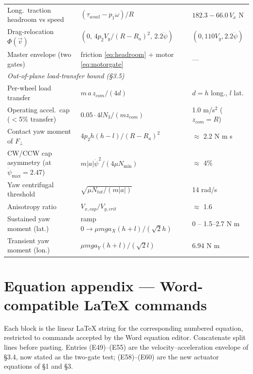 \documentclass[11pt]{article}
\begin{document}
\begin{table}[h]
\begin{tabular}{lll}
Long.\ traction headroom vs speed & $(\tau_{avail}-p_1\omega)/R$ & $182.3-66.0\,V_x$ N\\
Drag-relocation $\Phi(\vec v)$ & $(0,\,4p_2V_y/(R\!-\!R_a)^2,\,2.2\dot\psi)$ & $(0,110V_y,2.2\dot\psi)$\\
Master envelope (two gates) & friction \eqref{eq:headroom} + motor \eqref{eq:motorgate} & ---\\
\midrule
\multicolumn{3}{l}{\emph{Out-of-plane load-transfer bound (\S3.5)}}\\
Per-wheel load transfer & $m\,a\,z_{com}/(4d)$ & $d=h$ long., $l$ lat.\\
Operating accel.\ cap ($<$5\% transfer) & $0.05\cdot4lN_3/(m z_{com})$ & 1.0 m/s$^2$ ($z_{com}\!=\!R$)\\
\midrule
Contact yaw moment of $F_\perp$ & $4p_2h(h-l)/(R-R_a)^2$ & $\approx$ 2.2 N m s\\
CW/CCW cap asymmetry (at $\dot\psi_{\max}=2.47$) & $m|a|\dot\psi^2/(4\mu N_{\min})$ & $\approx$ 4\%\\
Yaw centrifugal threshold & $\sqrt{\mu N_{tot}/(m|a|)}$ & 14 rad/s\\
Anisotropy ratio & $V_{x,cap}/V_{y,crit}$ & $\approx$ 1.6\\
Sustained yaw moment (lat.) & ramp $0\to\mu mg a_X(h+l)/(\sqrt2 h)$ & 0 -- 1.5--2.7 N m\\
Transient yaw moment (lon.) & $\mu mg a_Y(h+l)/(\sqrt2 l)$ & 6.94 N m\\
\bottomrule
\end{tabular}
\end{table}

\appendix
\section{Equation appendix --- Word-compatible \LaTeX{} commands}
Each block is the linear \LaTeX{} string for the corresponding numbered equation, restricted to
commands accepted by the Word equation editor. Concatenate split lines before pasting. Entries
(E49)--(E55) are the velocity--acceleration envelope of \S3.4, now stated as the two-gate test;
(E58)--(E60) are the new actuator equations of \S1 and \S3.
\end{document}
